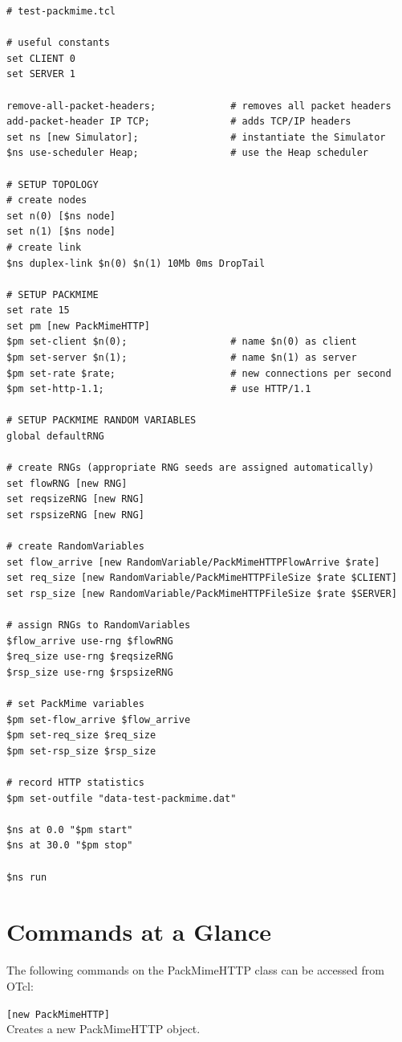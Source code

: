\begin{verbatim}
# test-packmime.tcl

# useful constants
set CLIENT 0
set SERVER 1

remove-all-packet-headers;             # removes all packet headers
add-packet-header IP TCP;              # adds TCP/IP headers
set ns [new Simulator];                # instantiate the Simulator
$ns use-scheduler Heap;                # use the Heap scheduler

# SETUP TOPOLOGY
# create nodes
set n(0) [$ns node]
set n(1) [$ns node]
# create link
$ns duplex-link $n(0) $n(1) 10Mb 0ms DropTail

# SETUP PACKMIME
set rate 15
set pm [new PackMimeHTTP]
$pm set-client $n(0);                  # name $n(0) as client
$pm set-server $n(1);                  # name $n(1) as server
$pm set-rate $rate;                    # new connections per second
$pm set-http-1.1;                      # use HTTP/1.1

# SETUP PACKMIME RANDOM VARIABLES
global defaultRNG

# create RNGs (appropriate RNG seeds are assigned automatically)
set flowRNG [new RNG]
set reqsizeRNG [new RNG]
set rspsizeRNG [new RNG]

# create RandomVariables
set flow_arrive [new RandomVariable/PackMimeHTTPFlowArrive $rate]
set req_size [new RandomVariable/PackMimeHTTPFileSize $rate $CLIENT]
set rsp_size [new RandomVariable/PackMimeHTTPFileSize $rate $SERVER]

# assign RNGs to RandomVariables
$flow_arrive use-rng $flowRNG
$req_size use-rng $reqsizeRNG
$rsp_size use-rng $rspsizeRNG

# set PackMime variables
$pm set-flow_arrive $flow_arrive
$pm set-req_size $req_size
$pm set-rsp_size $rsp_size

# record HTTP statistics
$pm set-outfile "data-test-packmime.dat"

$ns at 0.0 "$pm start"
$ns at 30.0 "$pm stop"

$ns run
\end{verbatim}

\section{Commands at a Glance}
The following commands on the PackMimeHTTP class can be accessed from OTcl:

{\tt [new PackMimeHTTP]}\\
Creates a new PackMimeHTTP object.

